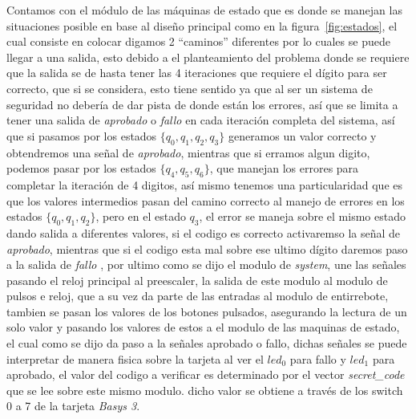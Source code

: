 \documentclass[a4paper, 12pt]{article}
\begin{document}
    Contamos con el módulo de las máquinas de estado que es donde se manejan las situaciones posible en base al diseño principal como en la figura~\ref{fig:estados}, el cual consiste en colocar  digamos 2 “caminos” diferentes por lo cuales se puede llegar a una salida, esto debido a el planteamiento del problema donde se requiere que la salida se de hasta tener las 4 iteraciones que requiere el dígito para ser correcto, que si se considera, esto tiene sentido ya que al ser un sistema de seguridad no debería de dar pista de donde están los errores, así que se limita a tener una salida de \emph{aprobado} o \emph{fallo} en cada iteración completa del sistema, así que si pasamos por los estados $ \{q_0,q_1,q_2,q_3\} $ generamos un valor correcto y obtendremos una señal de \emph{aprobado}, mientras que si erramos algun digito, podemos pasar por los estados $\{q_4,q_5,q_6\}$, que manejan los errores para completar la iteración de 4 digitos, así mismo tenemos una particularidad que es que los valores intermedios pasan del camino correcto al manejo de errores en los estados $\{q_0,q_1,q_2\}$, pero en el estado $q_3$, el error se maneja sobre el mismo estado dando salida a diferentes valores, si el codigo es correcto activaremso la señal de \emph{aprobado}, mientras que si el codigo esta mal sobre ese ultimo dígito daremos paso a  la salida de \emph{fallo} , por ultimo como se dijo el modulo de \emph{system}, une las señales pasando el reloj principal al preescaler, la salida de este modulo al modulo de pulsos e reloj, que a su vez da parte de las entradas al modulo de entirrebote, tambien se pasan los valores de los botones pulsados, asegurando la lectura de un solo valor y pasando los valores de estos a el modulo de las maquinas de estado, el cual como se dijo da paso a la señales aprobado o fallo, dichas señales se puede interpretar de manera fisica sobre la tarjeta al ver el $led_0$ para fallo y $led_1$ para aprobado, el valor del codigo a verificar es determinado por el vector \emph{secret\_code} que se lee sobre este mismo modulo. dicho valor se obtiene a través de los switch 0 a 7 de la tarjeta \emph{Basys 3}.
\end{document}
